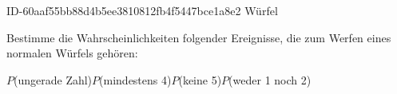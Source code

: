 \begin{exercise}
      {ID-60aaf55bb88d4b5ee3810812fb4f5447bce1a8e2}
      {Würfel}
  \ifproblem\problem\par
    Bestimme die Wahrscheinlichkeiten folgender Ereignisse, die zum Werfen eines
    \glqq normalen\grqq{} Würfels gehören:
    \begin{center}
      $P$(ungerade Zahl)\qquad$P$(mindestens 4)\qquad$P$(keine 5)\qquad$P$(weder 1 noch 2)
    \end{center}
  \fi
\end{exercise}
